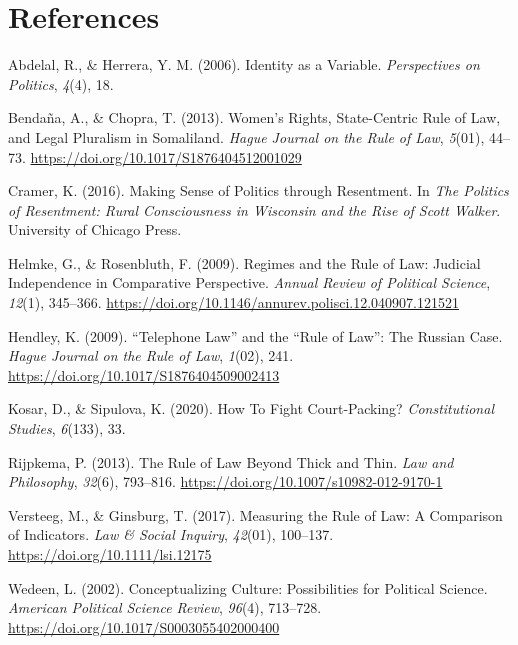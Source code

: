 \documentclass[
  english,
  man]{apa6}
\begin{document}
\newpage

\hypertarget{references}{%
\section{References}\label{references}}

\begingroup
\setlength{\parindent}{-0.5in}
\setlength{\leftskip}{0.5in}

\hypertarget{refs}{}
\leavevmode\hypertarget{ref-abdelalIdentityVariable2006}{}%
Abdelal, R., \& Herrera, Y. M. (2006). Identity as a Variable. \emph{Perspectives on Politics}, \emph{4}(4), 18.

\leavevmode\hypertarget{ref-bendanaWomenRightsStateCentric2013}{}%
Bendaña, A., \& Chopra, T. (2013). Women's Rights, State-Centric Rule of Law, and Legal Pluralism in Somaliland. \emph{Hague Journal on the Rule of Law}, \emph{5}(01), 44--73. \url{https://doi.org/10.1017/S1876404512001029}

\leavevmode\hypertarget{ref-cramerMakingSensePolitics2016}{}%
Cramer, K. (2016). Making Sense of Politics through Resentment. In \emph{The Politics of Resentment: Rural Consciousness in Wisconsin and the Rise of Scott Walker}. University of Chicago Press.

\leavevmode\hypertarget{ref-helmkeRegimesRuleLaw2009}{}%
Helmke, G., \& Rosenbluth, F. (2009). Regimes and the Rule of Law: Judicial Independence in Comparative Perspective. \emph{Annual Review of Political Science}, \emph{12}(1), 345--366. \url{https://doi.org/10.1146/annurev.polisci.12.040907.121521}

\leavevmode\hypertarget{ref-hendleyTelephoneLawRule2009}{}%
Hendley, K. (2009). ``Telephone Law'' and the ``Rule of Law'': The Russian Case. \emph{Hague Journal on the Rule of Law}, \emph{1}(02), 241. \url{https://doi.org/10.1017/S1876404509002413}

\leavevmode\hypertarget{ref-kosarHowFightCourtPacking2020}{}%
Kosar, D., \& Sipulova, K. (2020). How To Fight Court-Packing? \emph{Constitutional Studies}, \emph{6}(133), 33.

\leavevmode\hypertarget{ref-rijpkemaRuleLawThick2013}{}%
Rijpkema, P. (2013). The Rule of Law Beyond Thick and Thin. \emph{Law and Philosophy}, \emph{32}(6), 793--816. \url{https://doi.org/10.1007/s10982-012-9170-1}

\leavevmode\hypertarget{ref-versteegMeasuringRuleLaw2017}{}%
Versteeg, M., \& Ginsburg, T. (2017). Measuring the Rule of Law: A Comparison of Indicators. \emph{Law \& Social Inquiry}, \emph{42}(01), 100--137. \url{https://doi.org/10.1111/lsi.12175}

\leavevmode\hypertarget{ref-wedeenConceptualizingCulturePossibilities2002}{}%
Wedeen, L. (2002). Conceptualizing Culture: Possibilities for Political Science. \emph{American Political Science Review}, \emph{96}(4), 713--728. \url{https://doi.org/10.1017/S0003055402000400}

\endgroup
\end{document}
